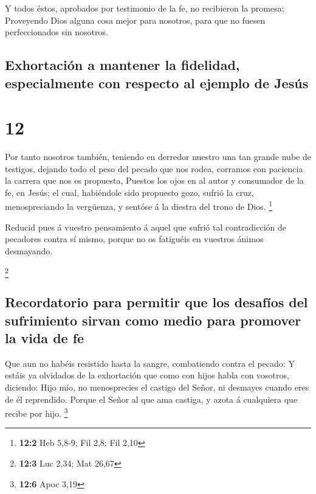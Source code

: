 Y todos éstos, aprobados por testimonio de la fe, no
recibieron la promesa;  Proveyendo Dios alguna cosa mejor
para nosotros, para que no fuesen perfeccionados sin nosotros.

\hypertarget{exhortaciuxf3n-a-mantener-la-fidelidad-especialmente-con-respecto-al-ejemplo-de-jesuxfas}{%
\subsection{Exhortación a mantener la fidelidad, especialmente con
respecto al ejemplo de
Jesús}\label{exhortaciuxf3n-a-mantener-la-fidelidad-especialmente-con-respecto-al-ejemplo-de-jesuxfas}}

\hypertarget{section-11}{%
\section{12}\label{section-11}}

 Por tanto nosotros también, teniendo en derredor nuestro
una tan grande nube de testigos, dejando todo el peso del pecado que nos
rodea, corramos con paciencia la carrera que nos es propuesta,
 Puestos los ojos en al autor y consumador de la fe, en
Jesús; el cual, habiéndole sido propuesto gozo, sufrió la cruz,
menospreciando la vergüenza, y sentóse á la diestra del trono de Dios.
\footnote{\textbf{12:2} Heb 5,8-9; Fil 2,8; Fil 2,10}

 Reducid pues á vuestro pensamiento á aquel que sufrió tal
contradicción de pecadores contra sí mismo, porque no os fatiguéis en
vuestros ánimos desmayando.

\footnote{\textbf{12:3} Luc 2,34; Mat 26,67}

\hypertarget{recordatorio-para-permitir-que-los-desafuxedos-del-sufrimiento-sirvan-como-medio-para-promover-la-vida-de-fe}{%
\subsection{Recordatorio para permitir que los desafíos del sufrimiento
sirvan como medio para promover la vida de
fe}\label{recordatorio-para-permitir-que-los-desafuxedos-del-sufrimiento-sirvan-como-medio-para-promover-la-vida-de-fe}}

 Que aun no habéis resistido hasta la sangre, combatiendo
contra el pecado:  Y estáis ya olvidados de la exhortación
que como con hijos habla con vosotros, diciendo: Hijo mío, no
menosprecies el castigo del Señor, ni desmayes cuando eres de él
reprendido.  Porque el Señor al que ama castiga, y azota á
cualquiera que recibe por hijo. \footnote{\textbf{12:6} Apoc 3,19}

